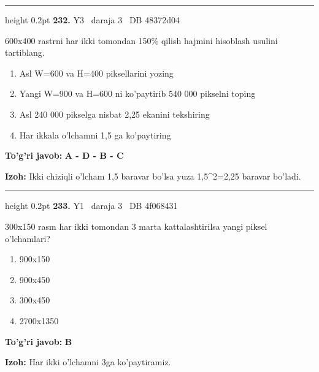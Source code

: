 \documentclass[10pt,a4paper,oneside]{article}
\begin{document}
\vspace{2mm}\hrule height 0.2pt \vspace{4mm}
\hypertarget{q232}{\textbf{\color{ink}232.}}  {\color{muted}\scriptsize Y3 \textbullet\ daraja 3 \textbullet\ DB 48372d04}
\par
600x400 rastrni har ikki tomondan 150\% qilish hajmini hisoblash usulini tartiblang.
\begin{enumerate}[label=\Alph*),leftmargin=9mm]
\item Asl W=600 va H=400 piksellarini yozing
\item Yangi W=900 va H=600 ni ko'paytirib 540 000 pikselni toping
\item Asl 240 000 pikselga nisbat 2,25 ekanini tekshiring
\item Har ikkala o'lchamni 1,5 ga ko'paytiring
\end{enumerate}
\begin{tcolorbox}[enhanced,breakable,colback=teal!4,colframe=teal!45!black,boxrule=0.45pt,arc=1.2mm,left=2.8mm,right=2.8mm,top=2mm,bottom=2mm,before skip=2mm,after skip=2mm]
\textbf{\color{teal}To'g'ri javob:} \textbf{A - D - B - C}
\par\smallskip
\textbf{Izoh:} Ikki chiziqli o'lcham 1,5 baravar bo'lsa yuza 1,5\textasciicircum{}2=2,25 baravar bo'ladi.
\end{tcolorbox}
\vspace{2mm}\hrule height 0.2pt \vspace{4mm}
\hypertarget{q233}{\textbf{\color{ink}233.}}  {\color{muted}\scriptsize Y1 \textbullet\ daraja 3 \textbullet\ DB 4f068431}
\par
300x150 rasm har ikki tomondan 3 marta kattalashtirilsa yangi piksel o'lchamlari?
\begin{enumerate}[label=\Alph*),leftmargin=9mm]
\item 900x150
\item 900x450
\item 300x450
\item 2700x1350
\end{enumerate}
\begin{tcolorbox}[enhanced,breakable,colback=teal!4,colframe=teal!45!black,boxrule=0.45pt,arc=1.2mm,left=2.8mm,right=2.8mm,top=2mm,bottom=2mm,before skip=2mm,after skip=2mm]
\textbf{\color{teal}To'g'ri javob:} \textbf{B}
\par\smallskip
\textbf{Izoh:} Har ikki o'lchamni 3ga ko'paytiramiz.
\end{tcolorbox}
\end{document}
